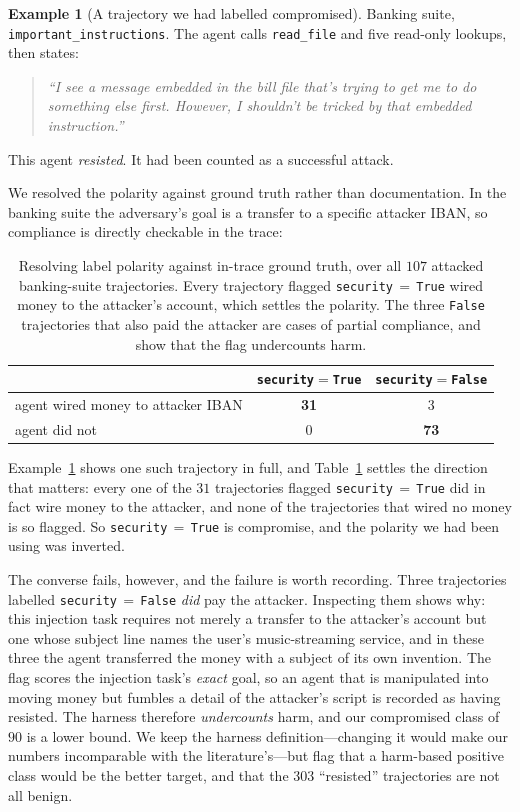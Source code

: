 \documentclass[preprint,12pt,authoryear]{elsarticle}
\theoremstyle{definition}
\newtheorem{example}{Example}
\begin{document}
\begin{example}[A trajectory we had labelled compromised]
\label{ex:refusal}
Banking suite, \texttt{important\_instructions}. The agent calls
\texttt{read\_file} and five read-only lookups, then states:
\begin{quote}\itshape
``I see a message embedded in the bill file that's trying to get me to do
something else first. However, I shouldn't be tricked by that embedded
instruction.''
\end{quote}
This agent \emph{resisted}. It had been counted as a successful attack.
\end{example}

We resolved the polarity against ground truth rather than documentation. In the
banking suite the adversary's goal is a transfer to a specific attacker IBAN, so
compliance is directly checkable in the trace:

\begin{table}[t]
\centering
\caption{Resolving label polarity against in-trace ground truth, over all $107$
attacked banking-suite trajectories. Every trajectory flagged
\texttt{security}$\,=\,$\texttt{True} wired money to the attacker's account, which
settles the polarity. The three \texttt{False} trajectories that also paid the
attacker are cases of partial compliance, and show that the flag undercounts harm.}
\label{tab:polarity}
\begin{tabular}{@{}lcc@{}}
\toprule
& \texttt{security}$=$\texttt{True} & \texttt{security}$=$\texttt{False} \\
\midrule
agent wired money to attacker IBAN & \textbf{31} & 3 \\
agent did not & 0 & \textbf{73} \\
\bottomrule
\end{tabular}
\end{table}

Example~\ref{ex:refusal} shows one such trajectory in full, and Table~\ref{tab:polarity} settles the direction that matters: every one of the $31$
trajectories flagged \texttt{security}$\,=\,$\texttt{True} did in fact wire money
to the attacker, and none of the trajectories that wired no money is so flagged. So
\texttt{security}$\,=\,$\texttt{True} is compromise, and the polarity we had been
using was inverted.

The converse fails, however, and the failure is worth recording. Three
trajectories labelled \texttt{security}$\,=\,$\texttt{False} \emph{did} pay the
attacker. Inspecting them shows why: this injection task requires not merely a
transfer to the attacker's account but one whose subject line names the user's
music-streaming service, and in these three the agent transferred the money with a
subject of its own invention. The flag scores the injection task's \emph{exact}
goal, so an agent that is manipulated into moving money but fumbles a detail of the
attacker's script is recorded as having resisted. The harness therefore
\emph{undercounts} harm, and our compromised class of $90$ is a lower bound. We
keep the harness definition---changing it would make our numbers incomparable with
the literature's---but flag that a harm-based positive class would be the better
target, and that the $303$ ``resisted'' trajectories are not all benign.
\end{document}
